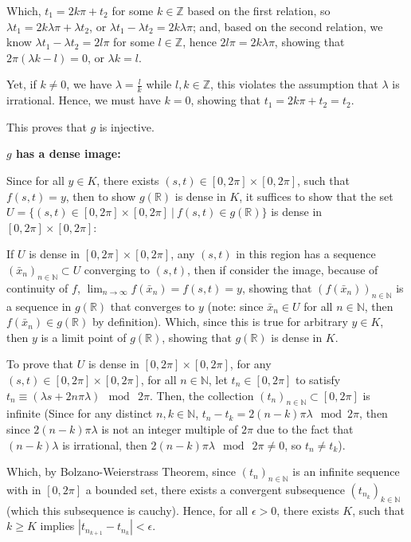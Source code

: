 \documentclass{article}
\begin{document}
\begin{itemize}
    Which, $t_1 = 2k\pi + t_2$ for some $k\in\mathbb{Z}$ based on the first relation, so $\lambda t_1 = 2k\lambda \pi + \lambda t_2$, or $\lambda t_1-\lambda t_2 = 2k\lambda \pi$;
    and, based on the second relation, we know $\lambda t_1 - \lambda t_2 = 2l\pi$ for some $l\in\mathbb{Z}$, hence $2l\pi = 2k\lambda \pi$, showing that $2\pi (\lambda k-l)=0$, or $\lambda k=l$.

    Yet, if $k\neq 0$, we have $\lambda = \frac{l}{k}$ while $l,k\in\mathbb{Z}$, this violates the assumption that $\lambda$ is irrational. Hence, we must have $k=0$, showing that $t_1 = 2k\pi + t_2 = t_2$.

    This proves that $g$ is injective.

    \hfil

    \textbf{$g$ has a dense image:}

    Since for all $y\in K$, there exists $(s,t)\in [0,2\pi]\times [0,2\pi]$, such that $f(s,t)=y$, then to show $g(\mathbb{R})$ is dense in $K$, it suffices to show that the set $U=\{(s,t)\in [0,2\pi]\times [0,2\pi]\ |\ f(s,t)\in g(\mathbb{R})\}$ is dense in $[0,2\pi]\times [0,2\pi]$:
    
    If $U$ is dense in $[0,2\pi]\times [0,2\pi]$, any $(s,t)$ in this region has a sequence $(\bar{x}_n)_{n\in\mathbb{N}}\subset U$ converging to $(s,t)$, then if consider the image, because of continuity of $f$, $\lim_{n\rightarrow\infty}f(\bar{x}_n) = f(s,t)=y$, showing that $(f(\bar{x}_n))_{n\in\mathbb{N}}$
    is a sequence in $g(\mathbb{R})$ that converges to $y$ (note: since $\bar{x}_n\in U$ for all $n\in\mathbb{N}$, then $f(\bar{x}_n)\in g(\mathbb{R})$ by definition). Which, since this is true for arbitrary $y\in K$, then $y$ is a limit point of $g(\mathbb{R})$, showing that $g(\mathbb{R})$ is dense in $K$.

    \hfil

    To prove that $U$ is dense in $[0,2\pi]\times [0,2\pi]$, for any $(s,t)\in [0,2\pi]\times [0,2\pi]$, for all $n\in\mathbb{N}$, let $t_n\in [0,2\pi]$ to satisfy $t_n \equiv (\lambda s+2n\pi \lambda)\mod\ 2\pi$. Then, the collection $(t_n)_{n\in\mathbb{N}}\subset [0,2\pi]$ is infinite 
    (Since for any distinct $n,k\in\mathbb{N}$, $t_n - t_k = 2(n-k)\pi\lambda \mod 2\pi$, then since $2(n-k)\pi\lambda$ is not an integer multiple of $2\pi$ due to the fact that $(n-k)\lambda$ is irrational, then $2(n-k)\pi\lambda\mod\ 2\pi\neq 0$, so $t_n\neq t_k$).

    Which, by Bolzano-Weierstrass Theorem, since $(t_n)_{n\in\mathbb{N}}$ is an infinite sequence with in $[0,2\pi]$ a bounded set, there exists a convergent subsequence $(t_{n_k})_{k\in\mathbb{N}}$ (which this subsequence is cauchy).
    Hence, for all $\epsilon>0$, there exists $K$, such that $k\geq K$ implies $|t_{n_{k+1}}-t_{n_k}|<\epsilon$.


\end{itemize}
\end{document}
